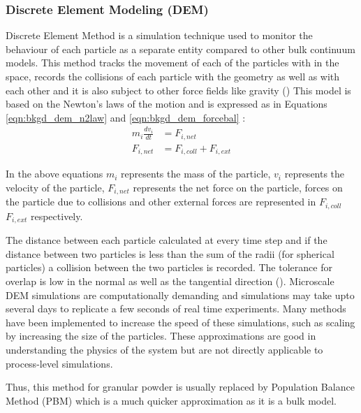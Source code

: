 \documentclass[preprint,11pt,authoryear]{elsarticle}
\begin{document}
	    \subsubsection{Discrete Element Modeling (DEM)}
	    \par Discrete Element Method is a simulation technique used to monitor the behaviour of each particle as a separate entity compared to other bulk continuum models. This method tracks the movement of each of the particles with in the space, records the collisions of each particle with the geometry as well as with each other and it is also subject to other force fields like gravity (\cite{Barrasso2015cerd})  This model is based on the Newton's laws of the motion and is expressed as in Equations \ref{eqn:bkgd_dem_n2law} and  \ref{eqn:bkgd_dem_forcebal} : \\
	\begin{align}
	m_i\frac{dv_i}{dt} &= F_{i,net} \label{eqn:bkgd_dem_n2law} \\
	F_{i,net} &=  F_{i,coll} +  F_{i,ext} \label{eqn:bkgd_dem_forcebal}
	\end{align}
	\par  In the above equations $m_i$ represents the mass of the particle, $v_i$ represents the velocity of the particle, $F_{i,net}$  represents the net force on the particle, forces on the particle due to collisions and other external forces are represented in $F_{i,coll}$ $F_{i,ext}$ respectively.
	\par The distance between each particle calculated at every time step and if the distance between two particles is less than the sum of the radii (for spherical particles)  a collision between the two particles is recorded. The tolerance for overlap is low in the normal as well as the tangential direction (\cite{Cundall1979}). Microscale DEM simulations are computationally demanding and simulations may take upto several days to replicate a few seconds of real time experiments. Many methods have been implemented to increase the speed of these simulations, such as scaling by increasing the size of the particles. These approximations are good in understanding the physics of the system but are not directly applicable to process-level simulations. 
	\par Thus, this method for granular powder is usually replaced by Population Balance Method (PBM) which is a much quicker approximation as it is a bulk model.  
\end{document}

